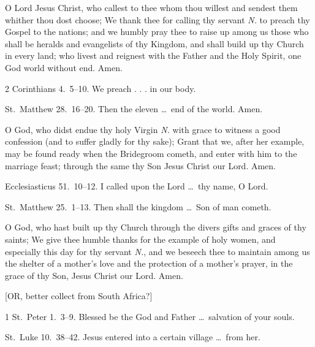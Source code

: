 
 O Lord Jesus Christ, who callest to thee whom thou willest and sendest them whither thou dost choose; We thank thee for calling thy servant \emph{N.} to preach thy Gospel to the nations; and we humbly pray thee to raise up among us those who shall be heralds and evangelists of thy Kingdom, and shall build up thy Church in every land; who livest and reignest with the Father and the Holy Spirit, one God world without end. \R Amen.

 2 Corinthians 4.~5–10.   We preach . . . in our body.

 St.~Matthew 28.~16–20.   Then the eleven \ldots\ end of the world. Amen.

\medskip


 O God, who didst endue thy holy Virgin \emph{N.} with grace to witness a good confession (and to suffer gladly for thy sake); Grant that we, after her example, may be found ready when the Bridegroom cometh, and enter with him to the marriage feast; through the same thy Son Jesus Christ our Lord. \R Amen.

 Ecclesiasticus 51.~10–12.   I called upon the Lord \ldots\ thy name, O Lord.

 St.~Matthew 25.~1–13.   Then shall the kingdom \ldots\ Son of man cometh.

\medskip


 O God, who hast built up thy Church through the divers gifts and graces of thy saints; We give thee humble thanks for the example of holy women, and especially this day for thy servant \emph{N.}, and we beseech thee to maintain among us the shelter of a mother’s love and the protection of a mother’s prayer, in the grace of thy Son, Jesus Christ our Lord. \R Amen.

[OR, better collect from South Africa?]

 1 St.~Peter 1.~3–9.   Blessed be the God and Father \ldots\ salvation of your souls.

 St.~Luke 10.~38–42.   Jesus entered into a certain village \ldots\ from her.

\medskip


